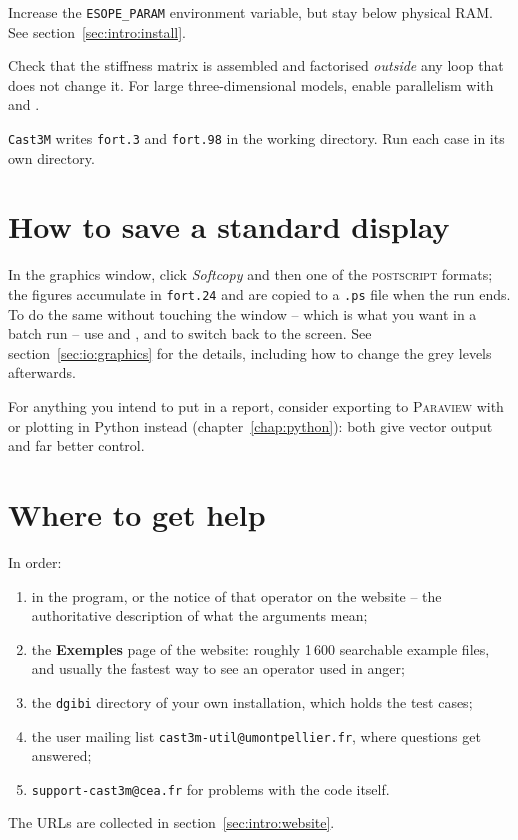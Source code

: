 \begin{description}[style=unboxed,leftmargin=0pt]

\item[\texttt{PAS ASSEZ DE PLACE EN MEMOIRE}] Increase the
  \texttt{ESOPE\_PARAM} environment variable, but stay below physical RAM.
  See section~\ref{sec:intro:install}.

\item[The run is very slow] Check that the stiffness matrix is assembled and
  factorised \emph{outside} any loop that does not change it. For large
  three-dimensional models, enable parallelism with 
  and .

\item[Two runs interfere with each other] \texttt{Cast3M} writes
  \texttt{fort.3} and \texttt{fort.98} in the working directory. Run each
  case in its own directory.

\end{description}

\section{How to save a standard display}

In the graphics window, click \emph{Softcopy} and then one of the
\textsc{postscript} formats; the figures accumulate in \texttt{fort.24} and
are copied to a \texttt{.ps} file when the run ends. To do the same without
touching the window -- which is what you want in a batch run -- use
 and , and
 to switch back to the screen. See
section~\ref{sec:io:graphics} for the details, including how to change the
grey levels afterwards.

For anything you intend to put in a report, consider exporting to
\textsc{Paraview} with  or plotting in Python instead
(chapter~\ref{chap:python}): both give vector output and far better control.

\section{Where to get help}

In order:

\begin{enumerate}
\item {} in the program, or the notice of that
  operator on the website -- the authoritative description of what the
  arguments mean;
\item the \textbf{Exemples} page of the website: roughly 1\,600 searchable
  example files, and usually the fastest way to see an operator used in
  anger;
\item the \texttt{dgibi} directory of your own installation, which holds the
  test cases;
\item the user mailing list \texttt{cast3m-util@\allowbreak umontpellier.fr},
  where questions get answered;
\item \texttt{support-cast3m@cea.fr} for problems with the code itself.
\end{enumerate}

\noindent The URLs are collected in section~\ref{sec:intro:website}.
